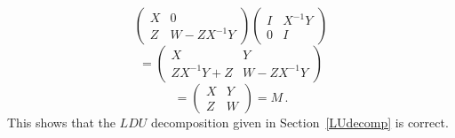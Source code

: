 {$$\left(\begin{array}{c|c}X&0\\\hline Z&W-ZX^{-1}Y\end{array}\right)
\left(\begin{array}{c|c}I&X^{-1}Y\\\hline 0&I\end{array}\right)
$$ $$=
\left(\begin{array}{c|c}X&Y\\\hline ZX^{-1}Y+Z&W-ZX^{-1}Y\end{array}\right)
$$
$$
=\left(\begin{array}{c|c}X&Y\\\hline Z&W\end{array}\right)=M\, .
$$
This shows that the $LDU$ decomposition given in Section~\ref{LUdecomp} is correct.
} %

